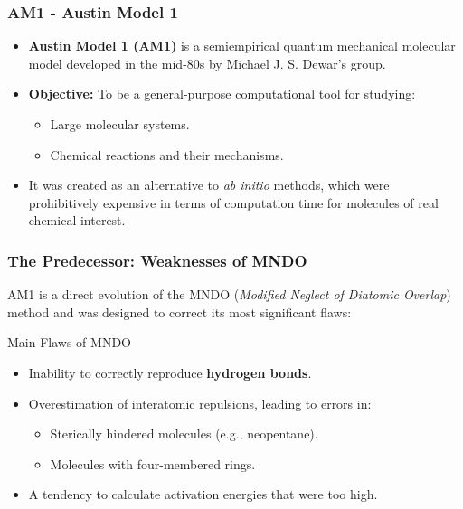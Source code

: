 \begin{frame}
  \frametitle{AM1 - Austin Model 1}
  
  \begin{itemize}
    \item \textbf{Austin Model 1 (AM1)} is a semiempirical quantum mechanical molecular model developed in the mid-80s by Michael J. S. Dewar's group. \pause
    \item \textbf{Objective:} To be a general-purpose computational tool for studying: \pause
    \begin{itemize}
        \item Large molecular systems. \pause
        \item Chemical reactions and their mechanisms. \pause
    \end{itemize}
    \item It was created as an alternative to \textit{ab initio} methods, which were prohibitively expensive in terms of computation time for molecules of real chemical interest.
  \end{itemize}
\end{frame}

\begin{frame}
  \frametitle{The Predecessor: Weaknesses of MNDO}
  
  AM1 is a direct evolution of the MNDO (\textit{Modified Neglect of Diatomic Overlap}) method and was designed to correct its most significant flaws: \pause
  
  \begin{block}{Main Flaws of MNDO}
    \begin{itemize}
      \item Inability to correctly reproduce \textbf{hydrogen bonds}. \pause
      \item Overestimation of interatomic repulsions, leading to errors in: \pause
      \begin{itemize}
          \item Sterically hindered molecules (e.g., neopentane). \pause
          \item Molecules with four-membered rings. \pause
      \end{itemize}
      \item A tendency to calculate activation energies that were too high.
    \end{itemize}
  \end{block}
\end{frame}

